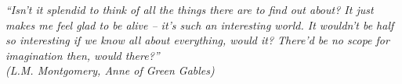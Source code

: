 \begin{epigrafe}
    \vspace*{\fill}
	\begin{flushright}
		\textit{``Isn't it splendid to think of all the things there are to find out about? It just makes me feel glad to be alive -- it's such an interesting world. It wouldn't be half so interesting if we know all about everything, would it? There'd be no scope for imagination then, would there?'' \\
		(L.M. Montgomery, Anne of Green Gables)}
	\end{flushright}
\end{epigrafe}